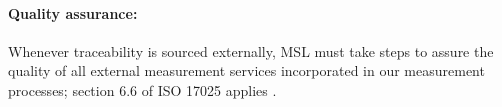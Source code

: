 \paragraph{Quality assurance:}
Whenever traceability is sourced externally, MSL must take steps to assure the quality of all external measurement services incorporated in our measurement processes; section 6.6 of ISO 17025 applies \cite{ISO_17025}. 
 



